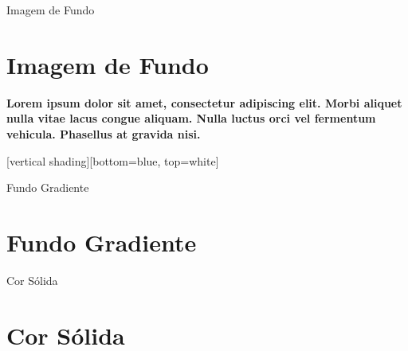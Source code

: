 \documentclass{beamer}
\begin{document}
{
\begin{frame}{Imagem de Fundo}
    \section{Imagem de Fundo}
    \color{red} \textbf{Lorem ipsum dolor sit amet, consectetur adipiscing elit. Morbi aliquet nulla vitae lacus congue aliquam. Nulla luctus orci vel fermentum vehicula. Phasellus at gravida nisi.}
\end{frame}
}

{
[vertical shading][bottom=blue, top=white]
\begin{frame}{Fundo Gradiente}
\section{Fundo Gradiente}
    
\end{frame}
}

{
\begin{frame}{Cor Sólida}
    \section{Cor Sólida}
\end{frame}
}
\end{document}
